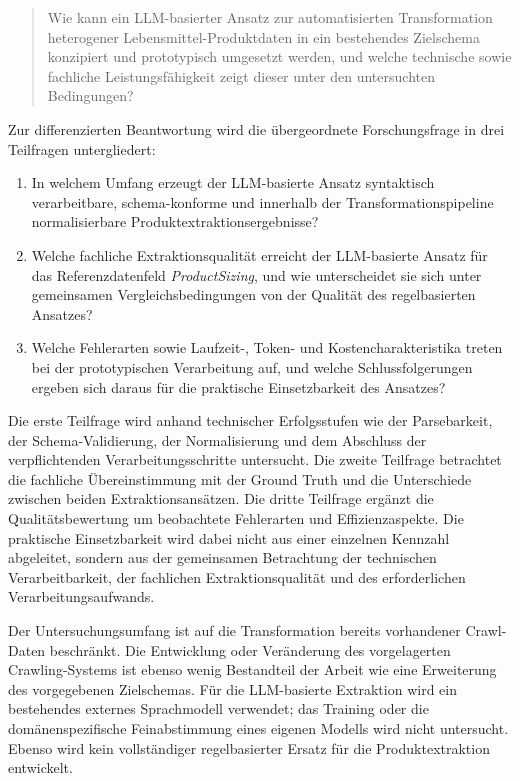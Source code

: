 \begin{quote}
Wie kann ein LLM-basierter Ansatz zur automatisierten Transformation heterogener Lebensmittel-Produktdaten in ein bestehendes Zielschema konzipiert und prototypisch umgesetzt werden, und welche technische sowie fachliche Leistungsfähigkeit zeigt dieser unter den untersuchten Bedingungen?
\end{quote}

Zur differenzierten Beantwortung wird die übergeordnete Forschungsfrage in drei Teilfragen untergliedert:

\begin{enumerate}
    \item In welchem Umfang erzeugt der LLM-basierte Ansatz syntaktisch verarbeitbare, schema-konforme und innerhalb der Transformationspipeline normalisierbare Produktextraktionsergebnisse?

    \item Welche fachliche Extraktionsqualität erreicht der LLM-basierte Ansatz für das Referenzdatenfeld \textit{ProductSizing}, und wie unterscheidet sie sich unter gemeinsamen Vergleichsbedingungen von der Qualität des regelbasierten Ansatzes?

    \item Welche Fehlerarten sowie Laufzeit-, Token- und Kostencharakteristika treten bei der prototypischen Verarbeitung auf, und welche Schlussfolgerungen ergeben sich daraus für die praktische Einsetzbarkeit des Ansatzes?
\end{enumerate}

Die erste Teilfrage wird anhand technischer Erfolgsstufen wie der Parsebarkeit, der Schema-Validierung, der Normalisierung und dem Abschluss der verpflichtenden Verarbeitungsschritte untersucht. Die zweite Teilfrage betrachtet die fachliche Übereinstimmung mit der Ground Truth und die Unterschiede zwischen beiden Extraktionsansätzen. Die dritte Teilfrage ergänzt die Qualitätsbewertung um beobachtete Fehlerarten und Effizienzaspekte. Die praktische Einsetzbarkeit wird dabei nicht aus einer einzelnen Kennzahl abgeleitet, sondern aus der gemeinsamen Betrachtung der technischen Verarbeitbarkeit, der fachlichen Extraktionsqualität und des erforderlichen Verarbeitungsaufwands.

Der Untersuchungsumfang ist auf die Transformation bereits vorhandener Crawl-Daten beschränkt. Die Entwicklung oder Veränderung des vorgelagerten Crawling-Systems ist ebenso wenig Bestandteil der Arbeit wie eine Erweiterung des vorgegebenen Zielschemas. Für die LLM-basierte Extraktion wird ein bestehendes externes Sprachmodell verwendet; das Training oder die domänenspezifische Feinabstimmung eines eigenen Modells wird nicht untersucht. Ebenso wird kein vollständiger regelbasierter Ersatz für die Produktextraktion entwickelt.


